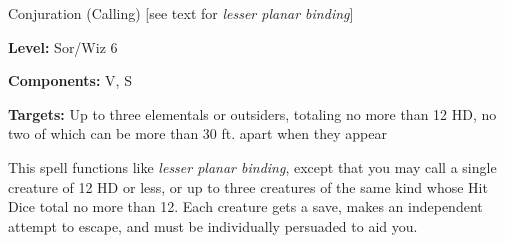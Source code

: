 
Conjuration (Calling) [see text for \textit{lesser planar binding}]

\textbf{Level:} Sor/Wiz 6

\textbf{Components:} V, S

\textbf{Targets:} Up to three elementals or outsiders, totaling no more than 12 
HD, no two of which can be more than 30 ft. apart when they appear

This spell functions like \textit{lesser planar binding}, except that you may call 
a single creature of 12 HD or less, or up to three creatures of the same kind whose 
Hit Dice total no more than 12. Each creature gets a save, makes an independent 
attempt to escape, and must be individually persuaded to aid you.

